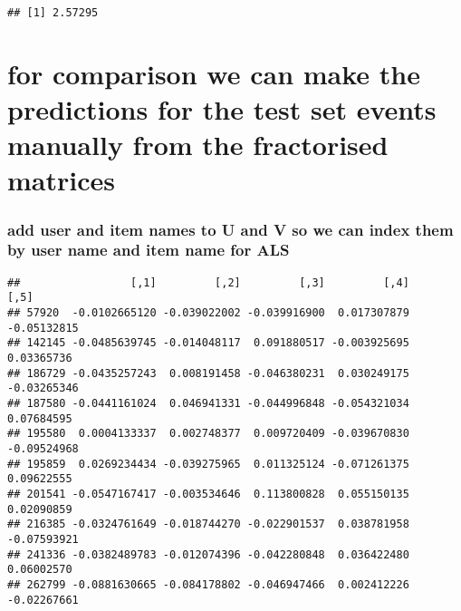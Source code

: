\documentclass[]{article}
\newenvironment{Shaded}{\begin{snugshade}}{\end{snugshade}}
\newcommand{\DecValTok}[1]{\textcolor[rgb]{0.00,0.00,0.81}{#1}}
\newcommand{\KeywordTok}[1]{\textcolor[rgb]{0.13,0.29,0.53}{\textbf{#1}}}
\newcommand{\NormalTok}[1]{#1}
\newcommand{\OperatorTok}[1]{\textcolor[rgb]{0.81,0.36,0.00}{\textbf{#1}}}
\newcommand{\StringTok}[1]{\textcolor[rgb]{0.31,0.60,0.02}{#1}}
\begin{document}
\begin{verbatim}
## [1] 2.57295
\end{verbatim}

\hypertarget{for-comparison-we-can-make-the-predictions-for-the-test-set-events-manually-from-the-fractorised-matrices}{%
\section{for comparison we can make the predictions for the test set
events manually from the fractorised
matrices}\label{for-comparison-we-can-make-the-predictions-for-the-test-set-events-manually-from-the-fractorised-matrices}}

\hypertarget{add-user-and-item-names-to-u-and-v-so-we-can-index-them-by-user-name-and-item-name-for-als}{%
\subsubsection{add user and item names to U and V so we can index them
by user name and item name for
ALS}\label{add-user-and-item-names-to-u-and-v-so-we-can-index-them-by-user-name-and-item-name-for-als}}

\begin{Shaded}
\end{Shaded}

\begin{verbatim}
##                 [,1]         [,2]         [,3]         [,4]        [,5]
## 57920  -0.0102665120 -0.039022002 -0.039916900  0.017307879 -0.05132815
## 142145 -0.0485639745 -0.014048117  0.091880517 -0.003925695  0.03365736
## 186729 -0.0435257243  0.008191458 -0.046380231  0.030249175 -0.03265346
## 187580 -0.0441161024  0.046941331 -0.044996848 -0.054321034  0.07684595
## 195580  0.0004133337  0.002748377  0.009720409 -0.039670830 -0.09524968
## 195859  0.0269234434 -0.039275965  0.011325124 -0.071261375  0.09622555
## 201541 -0.0547167417 -0.003534646  0.113800828  0.055150135  0.02090859
## 216385 -0.0324761649 -0.018744270 -0.022901537  0.038781958 -0.07593921
## 241336 -0.0382489783 -0.012074396 -0.042280848  0.036422480  0.06002570
## 262799 -0.0881630665 -0.084178802 -0.046947466  0.002412226 -0.02267661
\end{verbatim}
\end{document}
